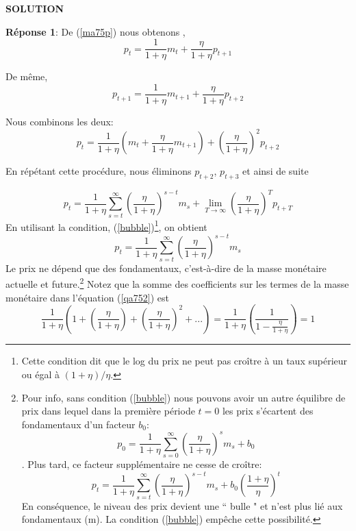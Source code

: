 \documentclass[a4paper,11pt]{article}
\begin{document}
\textbf{SOLUTION}

\bigskip

\textbf{Réponse 1}: De (\ref {ma75p}) nous obtenons
, \begin{equation}
p_t=\frac{1}{1+\eta}m_t +\frac{\eta}{1+\eta}p_{t+1}   \label{a75}
\end{equation} 

De même, \begin{equation}
p_{t+1}=\frac{1}{1+\eta}m_{t+1} +\frac{\eta}{1+\eta}p_{t+2}   \label{a752}
\end{equation} 

Nous combinons les deux: \begin{equation}
p_{t}=\frac{1}{1+\eta}\left(m_t+ \frac{\eta}{1+\eta}m_{t+1}\right) + \left(\frac{\eta}{1+\eta}\right)^2p_{t+2}   \label{a752}
\end{equation} 

En répétant cette procédure, nous éliminons $ p_{t + 2} $, $ p_{t + 3} $ et ainsi de suite

\begin{equation}
p_{t}=\frac{1}{1+\eta} \sum^{\infty}_{s=t} \left(\frac{\eta}{1+\eta}\right)^{s-t} m_s + \lim_{T\to \infty} \left(\frac{\eta}{1+\eta}\right)^Tp_{t+T}  \label{a752}
\end{equation} 
En utilisant la condition,  (\ref{bubble})\footnote{Cette condition dit que le log du prix  ne peut pas croître à un taux supérieur ou égal à $(1+\eta)/ \eta$.}, on obtient
\begin{equation}
p_{t}=\frac{1}{1+\eta} \sum^{\infty}_{s=t} \left(\frac{\eta}{1+\eta}\right)^{s-t} m_s   \label{qa752}
\end{equation} 
Le prix ne dépend que des fondamentaux, c'est-à-dire de la masse monétaire actuelle et future.\footnote{Pour info, sans condition (\ref{bubble}) nous pouvons avoir un autre équilibre de prix dans lequel dans la première période $ t = 0 $ les prix s'écartent des fondamentaux d'un facteur $b_0$: 
\begin{equation}  p_{0}=\frac{1}{1+\eta} \sum^{\infty}_{s=0} \left(\frac{\eta}{1+\eta}\right)^{s} m_s +b_0 
\end{equation}. Plus tard, ce facteur supplémentaire ne cesse de croître:
\begin{equation}
p_{t}=\frac{1}{1+\eta} \sum^{\infty}_{s=t} \left(\frac{\eta}{1+\eta}\right)^{s-t} m_s + b_0 \left(\frac{1+\eta}{\eta}\right)^{t}  \label{zqa752}
\end{equation} En conséquence, le niveau des prix devient une `` bulle " et n'est plus lié aux fondamentaux (m). La condition (\ref{bubble}) empêche cette possibilité.
 } Notez que la somme des coefficients sur les termes de la masse monétaire dans l'équation (\ref{qa752}) est 
\begin{equation}\label{uno}
\frac{1}{1+\eta}\left( 1+ \left(\frac{\eta}{1+\eta}\right) +  \left(\frac{\eta}{1+\eta}\right)^2+...\right)=\frac{1}{1+\eta}\left( \frac{1}{1-\frac{\eta}{1+\eta}} \right)=1
\end{equation}
\end{document}
